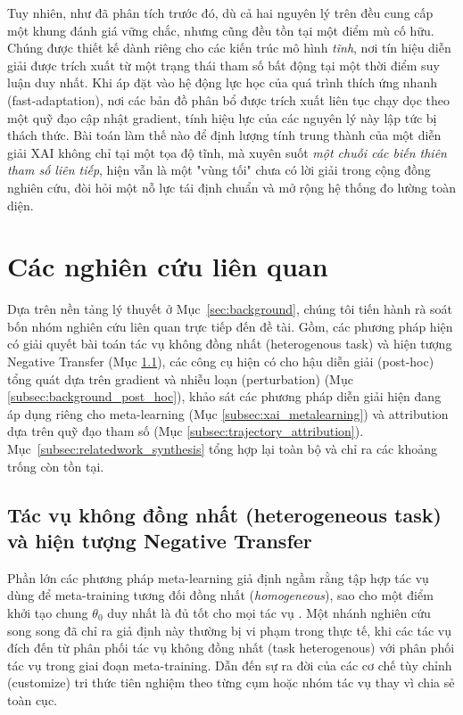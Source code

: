 Tuy nhiên, như đã phân tích trước đó, dù cả hai nguyên lý trên đều cung cấp một khung đánh giá vững chắc, nhưng cũng đều tồn tại một điểm mù cố hữu. Chúng được thiết kế dành riêng cho các kiến trúc mô hình \emph{tĩnh}, nơi tín hiệu diễn giải được trích xuất từ một trạng thái tham số bất động tại một thời điểm suy luận duy nhất. Khi áp đặt vào hệ động lực học của quá trình thích ứng nhanh (fast-adaptation), nơi các bản đồ phân bổ được trích xuất liên tục chạy dọc theo một quỹ đạo cập nhật gradient, tính hiệu lực của các nguyên lý này lập tức bị thách thức. Bài toán làm thế nào để định lượng tính trung thành của một diễn giải XAI không chỉ tại một tọa độ tĩnh, mà xuyên suốt \emph{một chuỗi các biến thiên tham số liên tiếp}, hiện vẫn là một "vùng tối" chưa có lời giải trong cộng đồng nghiên cứu, đòi hỏi một nỗ lực tái định chuẩn và mở rộng hệ thống đo lường toàn diện.

\section{Các nghiên cứu liên quan}

Dựa trên nền tảng lý thuyết ở Mục~\ref{sec:background}, chúng tôi tiến hành rà soát bốn nhóm nghiên cứu liên quan trực tiếp đến đề tài. Gồm, các phương pháp hiện có giải quyết bài toán tác vụ không đồng nhất (heterogenous task) và hiện tượng Negative Transfer (Mục \ref{subsec:negative_transfer}), các công cụ hiện có cho hậu diễn giải (post-hoc) tổng quát dựa trên gradient và nhiễu loạn (perturbation) (Mục \ref{subsec:background_post_hoc}), khảo sát các phương pháp diễn giải hiện đang áp dụng riêng cho meta-learning (Mục \ref{subsec:xai_metalearning}) và attribution dựa trên quỹ đạo tham số (Mục \ref{subsec:trajectory_attribution}). Mục~\ref{subsec:relatedwork_synthesis} tổng hợp lại toàn bộ và chỉ ra các khoảng trống còn tồn tại.

\subsection{Tác vụ không đồng nhất (heterogeneous task) và hiện tượng Negative Transfer}
\label{subsec:negative_transfer}

Phần lớn các phương pháp meta-learning giả định ngầm rằng tập hợp tác vụ dùng để meta-training tương đối đồng nhất (\emph{homogeneous}), sao cho một điểm khởi tạo chung $\theta_0$ duy nhất là đủ tốt cho mọi tác vụ \cite{finn2017model, snell2017prototypical, vinyals2016matching, santoro2016meta}. Một nhánh nghiên cứu song song đã chỉ ra giả định này thường bị vi phạm trong thực tế, khi các tác vụ đích đến từ phân phối tác vụ không đồng nhất (task heterogenous) với phân phối tác vụ trong giai đoạn meta-training. Dẫn đến sự ra đời của các cơ chế tùy chỉnh (customize) tri thức tiên nghiệm theo từng cụm hoặc nhóm tác vụ thay vì chia sẻ toàn cục.

